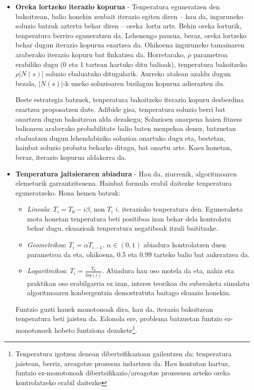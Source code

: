 \documentclass[eu]{ifirak}\usepackage[]{graphicx}\usepackage[]{color}
\newcommand{\zkk}{\guillemotleft}
\newcommand{\skk}{\guillemotright}
\begin{document}
\begin{itemize}
\item \textbf{Oreka lortzeko iterazio kopurua} - Tenperatura eguneratzen den bakoitzean, balio honekin zenbait iterazio egiten diren -- hau da, inguruneko soluzio batzuk aztertu behar diren -- \zkk oreka\skk\ lortu arte. Behin oreka lorturik, tenperatura berriro eguneratzen da. Lehenengo pausua, beraz, oreka lortzeko behar dugun iterazio kopurua ezartzea da. Ohikoena inguruneko tamainaren araberako iterazio kopuru bat finkatzea da. Horretarako, $\rho$ parametroa erabiliko dugu (0 eta 1 tartean hartuko ditu balioak), tenperatura bakoitzeko $\rho|N(s)|$ soluzio ebaluatuko ditugularik. Aurreko atalean azaldu dugun bezala, $|N(s)|$-k uneko soluzioaren bizilagun kopurua adierazten du.

Beste estrategia batzuek, tenperatura bakoitzeko iterazio kopuru desberdina ezartzea proposatzen dute.  Adibide gisa, tenperatura soluzio berri bat onartzen dugun bakoitzean alda dezakegu; Soluzioen onarpena haien fitness balioaren araberako probabilitate balio baten menpekoa denez, batzuetan ebaluatzen dugun lehendabiziko soluzioa onartuko dugu eta, bestetan, hainbat soluzio probatu beharko ditugu, bat onartu arte. Kasu honetan, beraz, iterazio kopurua aldakorra da. 


\item \textbf{Tenperatura jaitsieraren abiadura} - Hau da, ziurrenik, algoritmoaren elemeturik garrantzitsuena. Hainbat formula erabil daitezke tenperatura eguneratzeko. Hona hemen batzuk:
  \begin{itemize}
  \item \textit{Lineala}: $T_i=T_0 - i\beta$, non $T_i$ $i$. iterazioko tenperatura den. Eguneraketa mota honetan tenperatura beti positiboa izan behar dela kontrolatu behar dugu, ekuazioak tenperatura negatiboak itzuli baititzake.
  \item \textit{Geometrikoa}: $T_i = \alpha T_{i-1}$. $\alpha \in (0,1)$ abiadura kontrolatzen duen parametroa da eta, ohikoena, 0.5 eta 0.99 tarteko balio bat aukeratzea da.
  \item \textit{Logaritmikoa}: $T_i=\frac{T_0}{log(i)}$. Abiadura hau oso motela da eta, nahiz eta praktikan oso erabilgarria ez izan, interes teorikoa du suberaketa simulatu algoritmoaren konbergentzia demostratuta baitago ekuazio honekin.
\end{itemize}
Funtzio guzti hauek monotonoak dira, hau da, iterazio bakoitzean tenperatura beti jaisten da. Edonola ere, problema batzuetan funtzio ez-monotonoek hobeto funtziona dezakete\footnote{Tenperatura igotzen denean dibertsifikazioan gailentzen da; tenperatura jaistean, berriz, areagotze prozesua indartzen da. Hau kontutan hartuz, funtzio ez-monotonoak dibertsifikazio/areagotze prozesuen arteko oreka kontrolatzeko erabil daitezke}.


\end{itemize}
\end{document}
